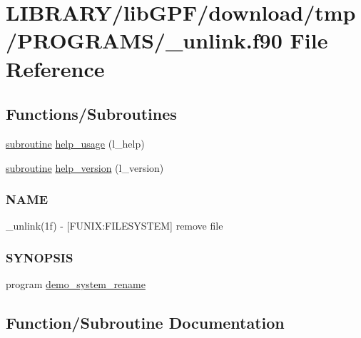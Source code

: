 \hypertarget{__unlink_8f90}{}\section{L\+I\+B\+R\+A\+R\+Y/lib\+G\+P\+F/download/tmp/\+P\+R\+O\+G\+R\+A\+M\+S/\+\_\+unlink.f90 File Reference}
\label{__unlink_8f90}
\subsection*{Functions/\+Subroutines}
\begin{DoxyCompactItemize}
\item 
\hyperlink{M__stopwatch_83_8txt_acfbcff50169d691ff02d4a123ed70482}{subroutine} \hyperlink{__unlink_8f90_a3e09a3b52ee8fb04eeb93fe5761626a8}{help\+\_\+usage} (l\+\_\+help)
\item 
\hyperlink{M__stopwatch_83_8txt_acfbcff50169d691ff02d4a123ed70482}{subroutine} \hyperlink{__unlink_8f90_a39c21619b08a3c22f19e2306efd7f766}{help\+\_\+version} (l\+\_\+version)
\begin{DoxyCompactList}\small\item\em \subsubsection*{N\+A\+ME}

\+\_\+unlink(1f) -\/ \mbox{[}F\+U\+N\+IX\+:F\+I\+L\+E\+S\+Y\+S\+T\+EM\mbox{]} remove file \subsubsection*{S\+Y\+N\+O\+P\+S\+IS}\end{DoxyCompactList}\item 
program \hyperlink{__unlink_8f90_aad99fde3e962ae73c9d6bc3825b8ca79}{demo\+\_\+system\+\_\+rename}
\end{DoxyCompactItemize}


\subsection{Function/\+Subroutine Documentation}
\mbox{\label{__unlink_8f90_aad99fde3e962ae73c9d6bc3825b8ca79}} 
